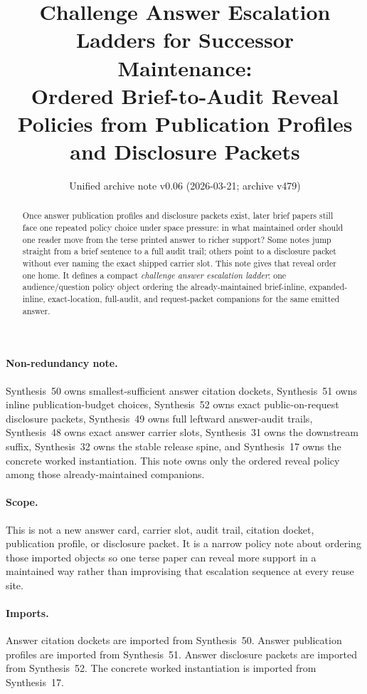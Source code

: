 \documentclass[11pt]{article}
\title{Challenge Answer Escalation Ladders for Successor Maintenance:\\[0.5ex]
\large Ordered Brief-to-Audit Reveal Policies from Publication Profiles and Disclosure Packets}
\author{}
\date{Unified archive note v0.06 (2026-03-21; archive v479)}
\begin{document}
\maketitle

\begin{abstract}
Once answer publication profiles and disclosure packets exist, later brief papers still face one repeated policy choice under space pressure: in what maintained order should one reader move from the terse printed answer to richer support? Some notes jump straight from a brief sentence to a full audit trail; others point to a disclosure packet without ever naming the exact shipped carrier slot. This note gives that reveal order one home. It defines a compact \emph{challenge answer escalation ladder}: one audience/question policy object ordering the already-maintained brief-inline, expanded-inline, exact-location, full-audit, and request-packet companions for the same emitted answer.
\end{abstract}

\paragraph{Non-redundancy note.}
Synthesis~50 owns smallest-sufficient answer citation dockets, Synthesis~51 owns inline publication-budget choices, Synthesis~52 owns exact public-on-request disclosure packets, Synthesis~49 owns full leftward answer-audit trails, Synthesis~48 owns exact answer carrier slots, Synthesis~31 owns the downstream suffix, Synthesis~32 owns the stable release spine, and Synthesis~17 owns the concrete worked instantiation.\cite{series:challengeanswercitationdockets,series:challengeanswerpublicationprofiles,series:challengeanswerdisclosurepackets,series:challengeansweraudittrails,series:challengeanswercarrierslots,series:downstreamnormalforms,series:releasespine,series:workedexample}
This note owns only the ordered reveal policy among those already-maintained companions.

\paragraph{Scope.}
This is not a new answer card, carrier slot, audit trail, citation docket, publication profile, or disclosure packet.
It is a narrow policy note about ordering those imported objects so one terse paper can reveal more support in a maintained way rather than improvising that escalation sequence at every reuse site.

\paragraph{Imports.}
Answer citation dockets are imported from Synthesis~50.\cite{series:challengeanswercitationdockets}
Answer publication profiles are imported from Synthesis~51.\cite{series:challengeanswerpublicationprofiles}
Answer disclosure packets are imported from Synthesis~52.\cite{series:challengeanswerdisclosurepackets}
The concrete worked instantiation is imported from Synthesis~17.\cite{series:workedexample}
\end{document}
